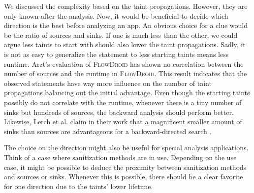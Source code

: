 \documentclass[../draft.tex]{subfiles}
\begin{document}
    We discussed the complexity based on the taint propagations.
    However, they are only known after the analysis.
    Now, it would be beneficial to decide which direction is the best before analyzing an app.
    An obvious choice for a clue would be the ratio of sources and sinks.
    If one is much less than the other, we could argue less taints to start with should also lower the taint propagations.
    Sadly, it is not as easy to generalize the statement to less starting taints means less runtime.
    Arzt's evaluation of \textsc{FlowDroid} has shown no correlation between the number of sources and the runtime in \textsc{FlowDroid}\cite{Arzt2017PhD}.
    This result indicates that the observed statements have way more influence on the number of taint propagations balancing out the initial advantage.
    Even though the starting taints possibly do not correlate with the runtime, whenever there is a tiny number of sinks but hundreds of sources, the backward analysis should perform better.
    Likewise, Lerch et al. claim in their work that a magnificent smaller amount of sinks than sources are advantageous for a backward-directed search \cite{Lerch2014}.

    The choice on the direction might also be useful for special analysis applications.
    Think of a case where sanitization methods\footnotemark{} are in use.
    Depending on the use case, it might be possible to deduce the proximity between sanitization methods and sources or sinks.
    Whenever this is possible, there should be a clear favorite for one direction due to the taints' lower lifetime.

\end{document}
